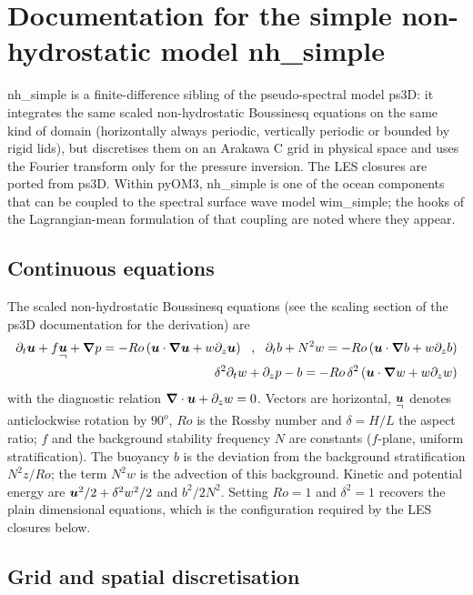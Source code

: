 \documentclass[12pt]{article}
\newcommand{\beq}  { \begin{eqnarray*} }
\newcommand{\eeq}  { \end{eqnarray*}}
\renewcommand{\v}[1]{{\mbox{\boldmath$ #1 $}}}  %
\newcommand{\pt}[1]{{\partial_t #1}}
\newcommand{\pz}[1]{{\partial_z #1}}
\newcommand{\vn}{{\v \nabla}}
\newcommand{\lk}{\left(}
\newcommand{\rk}{\right)}
\newcommand{\rvec} [1]{
    \raisebox{-1.5ex}{$\stackrel{\textstyle #1}{\neg}$} }%
\begin{document}
 

\section*{Documentation for the simple non-hydrostatic model nh\_simple}

nh\_simple is a finite-difference sibling of the pseudo-spectral model ps3D:
it integrates the same scaled non-hydrostatic Boussinesq equations on the
same kind of domain (horizontally always periodic, vertically periodic or
bounded by rigid lids), but discretises them on an Arakawa C grid in
physical space and uses the Fourier transform only for the pressure
inversion. The LES closures are ported from ps3D. Within pyOM3, nh\_simple
is one of the ocean components that can be coupled to the spectral surface
wave model wim\_simple; the hooks of the Lagrangian-mean formulation of
that coupling are noted where they appear.

\subsection*{Continuous equations}

The scaled non-hydrostatic Boussinesq equations (see the scaling section
of the ps3D documentation for the derivation) are
\beq
 \pt{\v u } + f \rvec{\v u}  +   \vn p =   
  - Ro \lk \v u \cdot \vn \v u +  w \pz{} \v u \rk
 ~~,~~
    \pt{b}  + N^2  w    =  -Ro \lk  \v u \cdot \vn b  +  w \pz{} b \rk
 \\
   \delta^2 \pt w +   \pz p -  b =  - Ro \, \delta^2  \lk   \v u \cdot \vn w +  w \pz{} w \rk
\eeq
with the diagnostic relation $\vn \cdot \v u + \pz w = 0$. Vectors are
horizontal, $\rvec{\v u}$ denotes anticlockwise rotation by $90^o$,
$Ro$ is the Rossby number and $\delta = H/L$ the aspect ratio;
$f$ and the background stability frequency $N$ are constants ($f$-plane,
uniform stratification). The buoyancy $b$ is the deviation from the
background stratification $N^2 z/Ro$; the term $N^2 w$ is the advection of
this background. Kinetic and potential energy are
$\v u^2/2 + \delta^2 w^2/2$ and $b^2/2N^2$. Setting $Ro = 1$ and
$\delta^2 = 1$ recovers the plain dimensional equations, which is the
configuration required by the LES closures below.

\subsection*{Grid and spatial discretisation}
\end{document}
